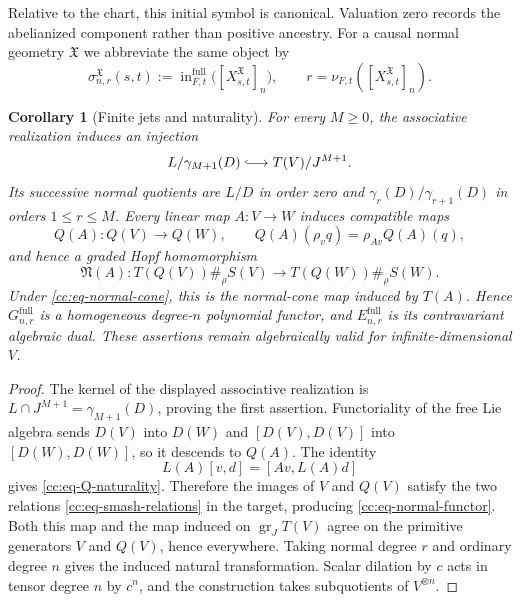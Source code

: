 \documentclass[10pt,reqno]{amsart}
\theoremstyle{plain}
\newtheorem{corollary}[theorem]{Corollary}
\theoremstyle{definition}
\theoremstyle{remark}
\begin{document}
Relative to the chart, this initial symbol is canonical.  Valuation zero
records the abelianized component rather than positive ancestry.  For a
causal normal geometry \(\mathfrak X\) we abbreviate the same object by
\begin{equation}
 \sigma_{n,r}^{\mathfrak X}(s,t)
 :=\operatorname{in}^{\mathrm{full}}_{F,t}
   \bigl([X^{\mathfrak X}_{s,t}]_n\bigr),
 \qquad r=\nu_{F,t}([X^{\mathfrak X}_{s,t}]_n).
 \label{cc:eq-causal-normal-symbol}
\end{equation}

\begin{corollary}[Finite jets and naturality]
\label{cc:cor-faithful-jets}
\label{cc:prop-naturality}
For every \(M\geq0\), the associative realization induces an injection
\[
 L/\gamma_{M+1}(D)\lhook\joinrel\longrightarrow T(V)/J^{M+1}.
\]
Its successive normal quotients are \(L/D\) in order zero and
\(\gamma_r(D)/\gamma_{r+1}(D)\) in orders \(1\leq r\leq M\).
Every linear map \(A:V\to W\) induces compatible maps
\begin{equation}
 Q(A):Q(V)\longrightarrow Q(W),
 \qquad
 Q(A)(\rho_vq)=\rho_{Av}Q(A)(q),
 \label{cc:eq-Q-naturality}
\end{equation}
and hence a graded Hopf homomorphism
\begin{equation}
 \mathfrak N(A):
 T(Q(V))\#_\rho S(V)\longrightarrow T(Q(W))\#_\rho S(W).
 \label{cc:eq-normal-functor}
\end{equation}
Under \eqref{cc:eq-normal-cone}, this is the normal-cone map induced
by \(T(A)\).  Hence \(G^{\mathrm{full}}_{n,r}\) is a homogeneous
degree-\(n\) polynomial functor, and \(E^{\mathrm{full}}_{n,r}\) is its
contravariant algebraic dual.  These assertions remain algebraically
valid for infinite-dimensional \(V\).
\end{corollary}

\begin{proof}
The kernel of the displayed associative realization is
\(L\cap J^{M+1}=\gamma_{M+1}(D)\), proving the first assertion.
Functoriality of the free Lie algebra sends \(D(V)\) into \(D(W)\) and
\([D(V),D(V)]\) into \([D(W),D(W)]\), so it descends to \(Q(A)\).
The identity
\[
 L(A)[v,d]=[Av,L(A)d]
\]
gives \eqref{cc:eq-Q-naturality}.  Therefore the images of \(V\) and
\(Q(V)\) satisfy the two relations \eqref{cc:eq-smash-relations} in the
target, producing \eqref{cc:eq-normal-functor}.  Both this map and the
map induced on \({\operatorname{gr}}_JT(V)\) agree on the primitive generators \(V\) and
\(Q(V)\), hence everywhere.  Taking normal degree \(r\) and ordinary
degree \(n\) gives the induced natural transformation.  Scalar dilation
by \(c\) acts in tensor degree \(n\) by \(c^n\), and the construction
takes subquotients of \(V^{\otimes n}\).
\end{proof}
\end{document}
